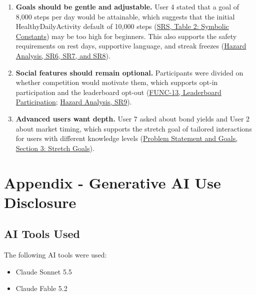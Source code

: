 \documentclass[12pt]{article}
\begin{document}
\begin{enumerate}
\item \textbf{Goals should be gentle and adjustable.} User 4 stated that a goal of 8,000 steps per day would be attainable, which suggests that the initial HealthyDailyActivity default of 10,000 steps (\href{https://github.com/arjunkarthik123/fitness-finance-application/blob/main/pdfs/SRS-Volere/SRS.pdf}{SRS, Table 2: Symbolic Constants}) may be too high for beginners. This also supports the safety requirements on rest days, supportive language, and streak freezes (\href{https://github.com/arjunkarthik123/fitness-finance-application/blob/main/pdfs/HazardAnalysis/HazardAnalysis.pdf}{Hazard Analysis, SR6, SR7, and SR8}).
\item \textbf{Social features should remain optional.} Participants were divided on whether competition would motivate them, which supports opt-in participation and the leaderboard opt-out (\href{https://github.com/arjunkarthik123/fitness-finance-application/blob/main/pdfs/SRS-Volere/SRS.pdf}{FUNC-13, Leaderboard Participation}; \href{https://github.com/arjunkarthik123/fitness-finance-application/blob/main/pdfs/HazardAnalysis/HazardAnalysis.pdf}{Hazard Analysis, SR9}).
\item \textbf{Advanced users want depth.} User 7 asked about bond yields and User 2 about market timing, which supports the stretch goal of tailored interactions for users with different knowledge levels (\href{https://github.com/arjunkarthik123/fitness-finance-application/blob/main/pdfs/ProblemStatementAndGoals/ProblemStatement.pdf}{Problem Statement and Goals, Section 3: Stretch Goals}).
\end{enumerate}

\newpage{}

\section{Appendix - Generative AI Use Disclosure}
\subsection{AI Tools Used}
The following AI tools were used:
\begin{itemize}
  \item Claude Sonnet 5.5
  \item Claude Fable 5.2
\end{itemize}
\end{document}
